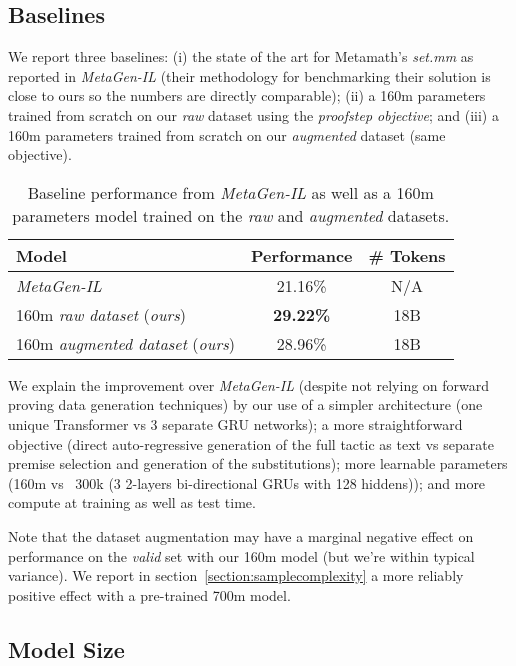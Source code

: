 \documentclass{article}
\begin{document}
\subsection{Baselines}

We report three baselines: (i) the state of the art for Metamath's \textit{set.mm} as reported in \textit{MetaGen-IL}\cite{wang2020learning} (their methodology for benchmarking their solution is close to ours so the numbers are directly comparable); (ii) a 160m parameters trained from scratch on our \textit{raw} dataset using the \textit{proofstep objective}; and (iii) a 160m parameters trained from scratch on our \textit{augmented} dataset (same objective).

\begin{table}[ht]
\caption{Baseline performance from \textit{MetaGen-IL} as well as a 160m parameters model trained on the \textit{raw} and \textit{augmented} datasets.} 
\centering
\begin{tabular}{ |l|c|c| }
    \hline
    Model & Performance & \# Tokens \\
    \hline
    \textit{MetaGen-IL}\cite{wang2020learning} & 21.16\% & N/A \\
    160m \textit{raw dataset} (\textit{ours}) & \textbf{29.22\%} & 18B \\
    160m \textit{augmented dataset} (\textit{ours}) & 28.96\% & 18B \\
    \hline
\end{tabular}
\label{table:baselines}
\end{table}

We explain the improvement over \textit{MetaGen-IL} (despite not relying on forward proving data generation techniques) by our use of a simpler architecture (one unique Transformer vs 3 separate GRU networks); a more straightforward objective (direct auto-regressive generation of the full tactic as text vs separate premise selection and generation of the substitutions); more learnable parameters (160m vs ~300k (3 2-layers bi-directional GRUs with 128 hiddens)); and more compute at training as well as test time.

Note that the dataset augmentation may have a marginal negative effect on performance on the \textit{valid} set with our 160m model (but we're within typical variance). We report in section~\ref{section:samplecomplexity} a more reliably positive effect with a pre-trained 700m model.

\subsection{Model Size}
\end{document}
